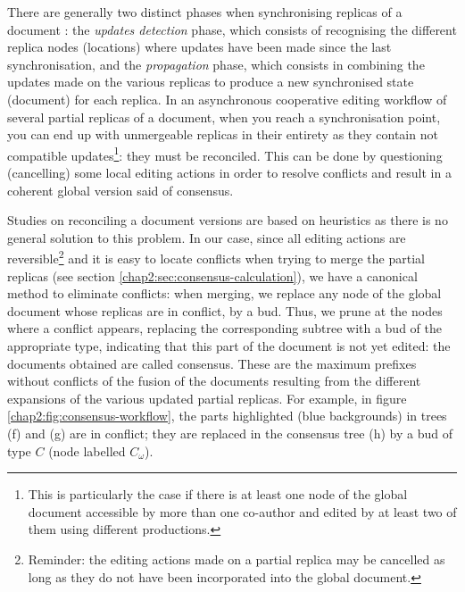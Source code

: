 \label{chap2:sec:consensus-reconciliation}

\label{chap2:sec:consensus-reconciliation-issue-principle}
There are generally two distinct phases when synchronising replicas of a document \cite{balasubramaniam98what}: the \textit{updates detection} phase, which consists of recognising the different replica nodes (locations) where updates have been made since the last synchronisation, and the  \textit{propagation} phase, which consists in combining the updates made on the various replicas to produce a new synchronised state (document) for each replica.
In an asynchronous cooperative editing workflow of several partial replicas of a document, when you reach a synchronisation point, you can end up with unmergeable replicas in their entirety as they contain not compatible updates\footnote{This is particularly the case if there is at least one node of the global document accessible by more than one co-author and edited by at least two of them using different productions.}: they must be reconciled. This can be done by questioning (cancelling) some local editing actions in order to resolve conflicts and result in a coherent global version said of consensus.

Studies on reconciling a document versions are based on heuristics \cite{tomMens} as there is no general solution to this problem.
In our case, since all editing actions are reversible\footnote{Reminder: the editing actions made on a partial replica may be cancelled as long as they do not have been incorporated into the global document.} and it is easy to locate conflicts when trying to merge the partial replicas (see section \ref{chap2:sec:consensus-calculation}), we have a canonical method to eliminate conflicts: when merging, we replace any node of the global document whose replicas are in conflict, by a bud. Thus, we prune at the nodes where a conflict appears, replacing the corresponding subtree with a bud of the appropriate type, indicating that this part of the document is not yet edited: the documents obtained are called consensus. These are the maximum prefixes without conflicts of the fusion of the documents resulting from the different expansions of the various updated partial replicas. For example, in figure \ref{chap2:fig:consensus-workflow}, the parts highlighted (blue backgrounds) in trees (f) and (g) are in conflict;  they are replaced in the consensus tree (h) by a bud of type $C$ (node labelled $C_{\omega}$).

